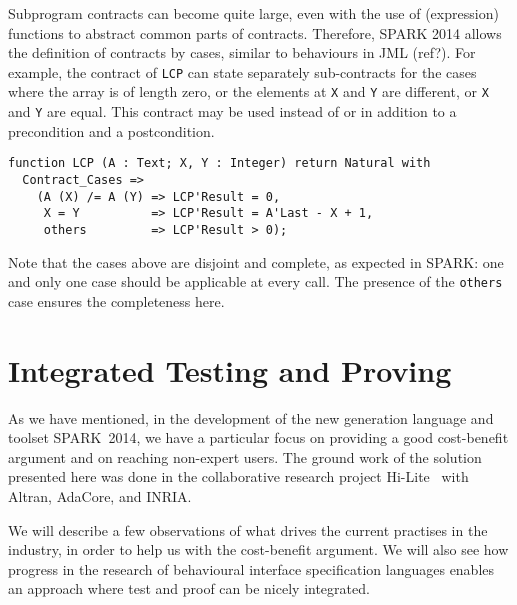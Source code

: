 \documentclass[sttt,draft]{svjour}
\newcommand{\hilite}{Hi-Lite}
\newcommand{\newspark}{SPARK~2014\xspace}
\begin{document}
Subprogram contracts can become quite large, even with the use of (expression)
functions to abstract common parts of contracts. Therefore, SPARK 2014 allows
the definition of contracts by cases, similar to behaviours in JML (ref?). For
example, the contract of \verb|LCP| can state separately sub-contracts for the
cases where the array is of length zero, or the elements at \verb|X| and
\verb|Y| are different, or \verb|X| and \verb|Y| are equal. This contract may
be used instead of or in addition to a precondition and a postcondition.

\begin{footnotesize}
\begin{verbatim}
function LCP (A : Text; X, Y : Integer) return Natural with
  Contract_Cases =>
    (A (X) /= A (Y) => LCP'Result = 0,
     X = Y          => LCP'Result = A'Last - X + 1,
     others         => LCP'Result > 0);
\end{verbatim}
\end{footnotesize}

Note that the cases above are disjoint and complete, as expected in SPARK: one
and only one case should be applicable at every call. The presence of the
\verb|others| case ensures the completeness here.

\section{Integrated Testing and Proving}
\label{hilite}
As we have mentioned, in the development of the new generation
language and toolset \newspark, we have a particular focus on
providing a good cost-benefit argument and on reaching non-expert
users. The ground work of the solution presented here was done in the
collaborative research project \hilite\ \cite{hiliteERTS2012} with
Altran, AdaCore, and INRIA.

We will describe a few observations of what drives the current
practises in the industry, in order to help us with the cost-benefit
argument. We will also see how progress in the research of behavioural
interface specification languages \cite{HatcliffLLMP12} enables an
approach where test and proof can be nicely integrated.
\end{document}
